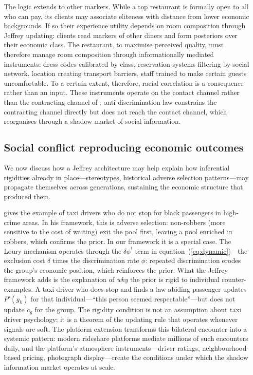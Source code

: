 \documentclass[12pt,a4paper]{article}
\theoremstyle{definition}
\numberwithin{proposition}{subsection}
\begin{document}
The logic extends to other markers. While a top restaurant is formally
open to all who can pay, its clients may associate eliteness with
distance from lower economic backgrounds. If so their experience utility depends
on room composition through Jeffrey updating: clients read markers
of other diners and form posteriors over their economic class. The
restaurant, to maximise perceived quality, must therefore manage room composition
through informationally mediated instruments: dress codes calibrated
by class, reservation systems filtering by social network, location
creating transport barriers, staff trained to make certain guests
uncomfortable. To a certain extent, therefore, racial correlation is a consequence rather than an input. These instruments operate on the contact channel rather than the
contracting channel of \citet{Loury2002}; anti-discrimination law
constrains the contracting channel directly but does not reach the
contact channel, which reorganises through a shadow market of
social information.


\subsection{Social conflict reproducing economic outcomes}
\label{subsec:cluster-reproduce}

We now discuss how a Jeffrey architecture may help explain how inferential
rigidities already in place---stereotypes, historical adverse
selection patterns---may propagate themselves across generations,  sustaining the economic structure that produced them.

\citet{Loury2002} gives the example of taxi drivers who do not stop
for black passengers in high-crime areas. In his framework, this is
adverse selection: non-robbers (more sensitive to the cost of
waiting) exit the pool first, leaving a pool enriched in robbers,
which confirms the prior. In our framework it is a special case. The
Loury mechanism operates through the $\delta \phi^t$ term in
equation~(\ref{eq:dynamic})---the exclusion cost $\delta$ times the
discrimination rate $\phi$: repeated discrimination erodes the
group's economic position, which reinforces the prior. What the
Jeffrey framework adds is the explanation of \emph{why} the prior is
rigid to individual counter-examples. A taxi driver who does stop
and finds a law-abiding passenger updates $P'(g_k)$ for that
individual---``this person seemed respectable''---but does not update
$\bar{c}_g$ for the group. The rigidity condition is not an
assumption about taxi driver psychology; it is a theorem of the
updating rule that operates whenever signals are soft. The platform
extension transforms this bilateral encounter into a systemic
pattern: modern rideshare platforms mediate millions of such
encounters daily, and the platform's atmosphere instruments---driver
ratings, neighbourhood-based pricing, photograph display---create
the conditions under which the shadow information market operates
at scale.
\end{document}
